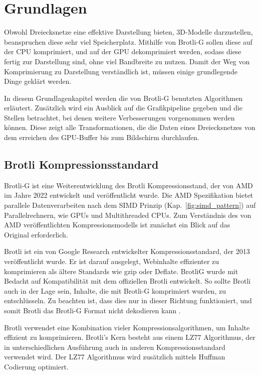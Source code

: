 \section{Grundlagen}

Obwohl Dreiecksnetze eine effektive Darstellung bieten, 3D-Modelle darzustellen, beanspruchen diese sehr viel Speicherplatz.
Mithilfe von Brotli-G sollen diese auf der CPU komprimiert, und auf der GPU dekomprimiert werden, sodass diese fertig zur Darstellung sind, ohne viel Bandbreite zu nutzen.
Damit der Weg von Komprimierung zu Darstellung verständlich ist, müssen einige grundlegende Dinge geklärt werden.

In diesem Grundlagenkapitel werden die von Brotli-G benutzten Algorithmen erläutert.
Zusätzlich wird ein Ausblick auf die Grafikpipeline gegeben und die Stellen betrachtet, bei denen weitere Verbesserungen vorgenommen werden können.
Diese zeigt alle Transformationen, die die Daten eines Dreiecksnetzes von dem erreichen des GPU-Buffer bis zum Bildschirm durchlaufen.

\subsection{Brotli Kompressionsstandard}
\label{subsec:brotli}
Brotli-G ist eine Weiterentwicklung des Brotli Kompressionsstand, der von AMD im Jahre 2022 entwickelt und veröffentlicht wurde.
Die AMD Spezifikation bietet parallele Datenverarbeiten nach dem SIMD Prinzip (Kap.~\ref{fig:simd_pattern}) auf Parallelrechnern, wie GPUs und Multithreaded CPUs.
Zum Verständnis des von AMD veröffentlichten Kompressionsmodells ist zunächst ein Blick auf das Original erforderlich. \newline

Brotli ist ein von Google Research entwickelter Kompressionsstandard, der 2013 veröffentlicht wurde.
Er ist darauf ausgelegt, Webinhalte effizienter zu komprimieren als ältere Standards wie gzip oder Deflate.
BrotliG wurde mit Bedacht auf Kompatibilität mit dem offiziellen Brotli entwickelt.
So sollte Brotli auch in der Lage sein, Inhalte, die mit Brotli-G komprimiert wurden, zu entschlüsseln.
Zu beachten ist, dass dies nur in dieser Richtung funktioniert, und somit Brotli das Brotli-G Format nicht dekodieren kann  \cite{BrotliG2022}.

Brotli verwendet eine Kombination vieler Kompressionsalgorithmen, um Inhalte effizient zu komprimieren. 
Brotli's Kern besteht aus einem LZ77 Algorithmus, der in unterschiedlichen Ausführung auch in anderen Kompressionsstandard verwendet wird.
Der LZ77 Algorithmus wird zusätzlich mittels Huffman Codierung optimiert.

